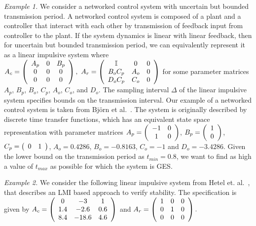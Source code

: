 \emph{Example 1.} We consider a networked control system with
uncertain but bounded transmission period.  A networked control system
is composed of a plant and a controller that interact with each other
by transmission of feedback input from controller to the plant.  If
the system dynamics is linear with linear feedback, then for uncertain
but bounded transmission period, we can equivalently represent it
as a linear impulsive system where $A_c=\left(\begin{array}{ccc} A_p & 0 & B_p\\ 0 & 0 &
  0\\ 0 & 0 & 0
\end{array}\right),~A_r=\left(\begin{array}{ccc}
\mathbb{I} & 0 & 0\\
B_oC_p & A_o & 0\\
D_oC_p & C_o & 0
\end{array}\right)$ for some parameter matrices $A_p$, $B_p$, $B_o$,
$C_p$, $A_o$, $C_o$, and $D_o$.  The sampling interval $\Delta$ of the
linear impulsive system specifies bounds on the transmission interval.
%
Our example of a networked control system is taken from Bj\"{o}rn et
al.~\cite{wittenmark2002computer}.  The system is originally described
by discrete time transfer functions, which has an equivalent state
space representation with parameter matrices
$A_p=\left(\begin{array}{cc}-1 & 0\\ 1 & 0\end{array}\right)$,
  $B_p=\left(\begin{array}{c}1\\ 0\end{array}\right)$,
    $C_p=\left(\begin{array}{cc}0 & 1\end{array}\right)$, $A_o=0.4286$,
      $B_o=-0.8163$, $C_o=-1$ and $D_o=-3.4286$.  Given the lower
      bound on the transmission period as $t_{min}=0.8$, we want to
      find as high a value of $t_{max}$ as possible for which the
      system is GES.

\emph{Example 2.} We consider the following linear impulsive system
from Hetel et. al.~\cite{2013hetel}, that describes an LMI based
approach to verify stability. The specification is given by
$A_c=\left(\begin{array}{ccc} 0 & -3 & 1\\ 1.4 & -2.6 & 0.6\\ 8.4 &
  -18.6 & 4.6
\end{array}\right)
$ and $A_r=\left(\begin{array}{ccc} 1 & 0 & 0\\ 0 & 1 & 0\\ 0 & 0 & 0
\end{array}\right).$




